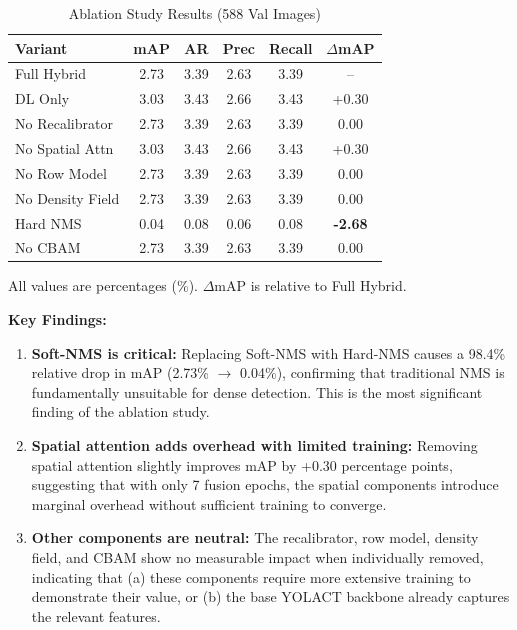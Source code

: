 \documentclass[conference]{IEEEtran}
\begin{document}
\begin{table}[t]
  \centering
  \caption{Ablation Study Results (588 Val Images)}
  \label{tab:ablation}
  \begin{tabular}{lccccc}
    \toprule
    \textbf{Variant} & \textbf{mAP} & \textbf{AR} & \textbf{Prec} &
    \textbf{Recall} & \textbf{$\Delta$mAP} \\
    \midrule
    Full Hybrid     & 2.73 & 3.39 & 2.63 & 3.39 & -- \\
    DL Only         & 3.03 & 3.43 & 2.66 & 3.43 & +0.30 \\
    No Recalibrator & 2.73 & 3.39 & 2.63 & 3.39 & 0.00 \\
    No Spatial Attn & 3.03 & 3.43 & 2.66 & 3.43 & +0.30 \\
    No Row Model    & 2.73 & 3.39 & 2.63 & 3.39 & 0.00 \\
    No Density Field & 2.73 & 3.39 & 2.63 & 3.39 & 0.00 \\
    Hard NMS        & 0.04 & 0.08 & 0.06 & 0.08 & \textbf{-2.68} \\
    No CBAM         & 2.73 & 3.39 & 2.63 & 3.39 & 0.00 \\
    \bottomrule
  \end{tabular}
  \vspace{2pt}
  {\small All values are percentages (\%). $\Delta$mAP is relative to Full Hybrid.}
\end{table}

\textbf{Key Findings:}

\begin{enumerate}
  \item \textbf{Soft-NMS is critical:} Replacing Soft-NMS with Hard-NMS causes
    a 98.4\% relative drop in mAP (2.73\% $\to$ 0.04\%), confirming that
    traditional NMS is fundamentally unsuitable for dense detection. This is
    the most significant finding of the ablation study.

  \item \textbf{Spatial attention adds overhead with limited training:} Removing
    spatial attention slightly improves mAP by +0.30 percentage points,
    suggesting that with only 7 fusion epochs, the spatial components introduce
    marginal overhead without sufficient training to converge.

  \item \textbf{Other components are neutral:} The recalibrator, row model,
    density field, and CBAM show no measurable impact when individually removed,
    indicating that (a) these components require more extensive training to
    demonstrate their value, or (b) the base YOLACT backbone already captures
    the relevant features.
\end{enumerate}
\end{document}
